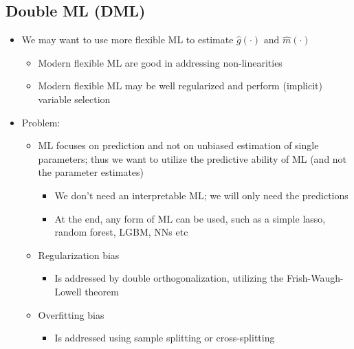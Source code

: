 \documentclass[10pt]{article}
\begin{document}
\subsection{Double ML (DML)}
\begin{itemize}
    \item We may want to use more flexible ML to estimate $\hat{g}(\cdot)\text{ and }\hat{m}(\cdot)$ 
    \begin{itemize}
        \item Modern flexible ML are good in addressing non-linearities 
        \item Modern flexible ML may be well regularized and perform (implicit) variable selection 
    \end{itemize}
    \item Problem: 
    \begin{itemize}
        \item ML focuses on prediction and not on unbiased estimation of single parameters; thus we want to utilize the predictive ability of ML (and not the parameter estimates)
        \begin{itemize}
            \item We don't need an interpretable ML; we will only need the predictions 
            \item At the end, any form of ML can be used, such as a simple lasso, random forest, LGBM, NNs etc 
        \end{itemize}
        \item Regularization bias 
        \begin{itemize}
            \item Is addressed by double orthogonalization, utilizing the Frish-Waugh-Lowell theorem 
        \end{itemize}
        \item Overfitting bias 
        \begin{itemize}
            \item Is addressed using sample splitting or cross-splitting 
        \end{itemize}
    \end{itemize}
\end{itemize}
\end{document}
